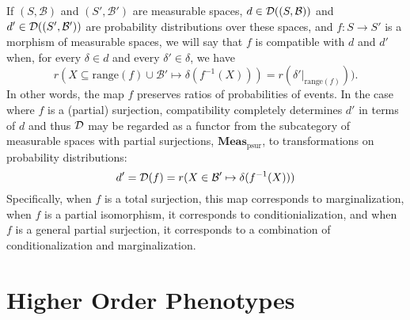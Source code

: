 If $(S, \mathcal{B})$ and $(S',\mathcal{B}')$ are measurable spaces, $d \in \mathcal{D}((S,\mathcal{B}))$ and $d' \in \mathcal{D}((S',\mathcal{B}'))$ are probability distributions over these spaces, and $f \colon S \to S'$ is a morphism of measurable spaces, we will say that $f$ is compatible with $d$ and $d'$ when, for every $\delta \in d$ and every $\delta' \in \delta$, we have
\[
 r(X \subseteq \mathrm{range}(f) \cup \mathcal{B}' \mapsto \delta(f^{-1}(X))) =
 r(\delta'|_{\mathrm{range}(f)})).
\]
In other words, the map $f$ preserves ratios of probabilities of events.  In the case where $f$ is a (partial) surjection, compatibility completely determines $d'$ in terms of $d$ and thus $\mathcal{D}$ may be regarded as a functor from the subcategory of measurable spaces with partial surjections, $\mathbf{Meas}_\mathrm{psur}$, to transformations on probability distributions:
\[
 d' = \mathcal{D}(f) = r(X \in \mathcal{B}' \mapsto \delta(f^{-1}(X)))
\]
Specifically, when $f$ is a total surjection, this map corresponds to marginalization, when $f$ is a partial isomorphism, it corresponds to conditionialization, and when $f$ is a general partial surjection, it corresponds to a combination of conditionalization and marginalization.


\section{Higher Order Phenotypes}

